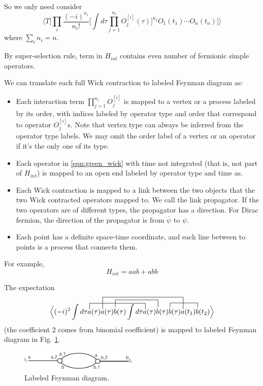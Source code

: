 \documentclass[12pt]{book}
\begin{document}
	So we only need consider
	\begin{equation}
		\Big \langle T\Big[ \prod_i \frac{(-i)^{n_i}}{n_i!}\Big[\int d\tau \prod_{j=1}^{n_i}O^{[i]}_j(\tau)\Big]^{n_j}O_1(t_1)\cdots O_n(t_n) \Big]\Big \rangle \label{eqn:green_wick}
	\end{equation} 
	where $\sum_in_i=n$.
	
	By super-selection rule, term in $H_{int}$ contains even number of fermionic simple operators.
	
	We can translate each full Wick contraction to labeled Feynman diagram as:
	\begin{itemize}
		\item Each interaction term $\prod_{j=1}^{n_i}O^{[i]}_j$ is mapped to a vertex or a process labeled by its order, with indices labeled by operator type and order that correspond to operator $O^{[i]}_j$s. Note that vertex type can always be inferred from the operator type labels. We may omit the order label of a vertex or an operator if it's the only one of its type.
		\item Each operator in \ref{eqn:green_wick} with time not integrated (that is, not part of $H_{int}$) is mapped to an open end labeled by operator type and time as.
		\item Each Wick contraction is mapped to a link between the two objects that the two Wick contracted operators mapped to. We call the link propagator. If the two operators are of different types, the propagator has a direction. For Dirac fermion, the direction of the propagator is from $\bar\psi$ to $\psi$.
		\item Each point has a definite space-time coordinate, and each line between to points is a process that connects them.
	\end{itemize}
	
	For example,
	\begin{equation}
		H_{int}=aab+abb
	\end{equation}
	
	The expectation
	\begin{equation}
		\contraction[2ex]{\Big \langle (-i)^2\int d\tau}{a}{(\tau)a(\tau)b(\tau)\int d\tau}{a}
		\contraction[4ex]{\Big \langle (-i)^2\int d\tau a(\tau)}{a}{(\tau)b(\tau)\int d\tau a(\tau)b(\tau)b(\tau)}{a}
		\contraction[2.5ex]{\Big \langle (-i)^2\int d\tau a(\tau)a(\tau)}{b}{(\tau)\int d\tau a(\tau)}{b}
		\contraction[1.5ex]{\Big \langle (-i)^2\int d\tau a(\tau)a(\tau)b(\tau)\int d\tau a(\tau)b(\tau)}{b}{(\tau)a(t_1)}{b}
		\Big \langle  (-i)^2\int d\tau a(\tau)a(\tau)b(\tau)\int d\tau a(\tau)b(\tau)b(\tau)a(t_1)b(t_2)\Big \rangle
	\end{equation} 
	(the coefficient 2 comes from binomial coefficient) is mapped to labeled Feynman diagram in Fig. \ref{fig:labeled_feyn}.
	\begin{figure}[htb]
		\centering  
		\includegraphics[width=0.5\textwidth]{resources/chap_feyn_diag/4_3_feyn_diag.pdf}
		\caption{Labeled Feynman diagram.}
		\label{fig:labeled_feyn} 
	\end{figure}
	
\end{document}
